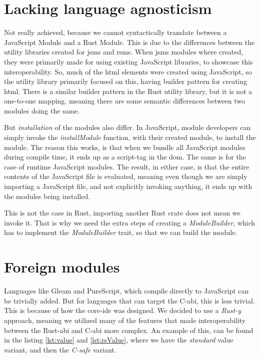 \section{Lacking language agnosticism} \label{sec:lla}

Not really achieved, because we cannot syntactically translate between a
JavaScript Module and a Rust Module. This is due to the differences between the
utility libraries created for \gls*{jsms} and \gls*{rsms}. When \gls*{jsms} modules
where created, they were primarily made for using existing JavaScript libraries,
to showcase this interoperability. So, much of the \gls*{html} elements were
created using JavaScript, so the utility library primarily focused on this,
having builder pattern for creating \gls*{html}. There is a similar builder
pattern in the Rust utility library, but it is not a one-to-one mapping, meaning
there are some semantic differences between two modules doing the same.

But \textit{installation} of the modules also differ. In JavaScript, module
developers can simply invoke the \textit{installModule} function, with their
created module, to install the module. The reason this works, is that when we
bundle all JavaScript modules during compile time, it ends up as a script-tag in
the \gls*{dom}. The same is for the case of runtime JavaScript modules. The
result, in either case, is that the entire contents of the JavaScript file is
evaluated, meaning even though we are simply importing a JavaScript file, and
not explicitly invoking anything, it ends up with the modules being installed.

This is not the case in Rust, importing another Rust crate does not mean we
invoke it. That is why we need the extra steps of creating a
\textit{ModuleBuilder}, which has to implement the \textit{ModuleBuilder} trait,
so that we can build the module.


\section{Foreign modules} \label{sec:fm}

Languages like Gleam and PureScript, which compile directly to JavaScript can
be trivially added. But for languages that can target the C-\gls*{abi}, this is
less trivial. This is because of how the core-\gls*{ide} was designed. We decided
to use a \textit{Rust-y} approach, meaning we utilized many of the features that
made interoperability between the Rust-\gls*{abi} and C-\gls*{abi} more complex.
An example of this, can be found in the listing \ref{lst:value} and
\ref{lst:rsValue}, where we have the \textit{standard} value variant, and then
the \textit{C-safe} variant.

